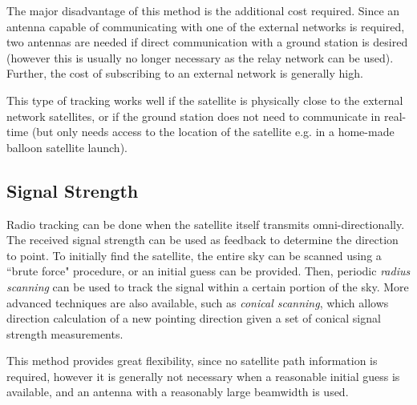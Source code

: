 The major disadvantage of this method is the additional cost required. Since an antenna capable of communicating with one of the external networks is required, two antennas are needed if direct communication with a ground station is desired (however this is usually no longer necessary as the relay network can be used). Further, the cost of subscribing to an external network is generally high.

This type of tracking works well if the satellite is physically close to the external network satellites, or if the ground station does not need to communicate in real-time (but only needs access to the location of the satellite e.g. in a home-made balloon satellite launch).

\subsection{Signal Strength}
Radio tracking can be done when the satellite itself transmits omni-directionally. The received signal strength can be used as feedback to determine the direction to point. To initially find the satellite, the entire sky can be scanned using a ``brute force" procedure, or an initial guess can be provided. Then, periodic \textit{radius scanning} can be used to track the signal within a certain portion of the sky. More advanced techniques are also available, such as \textit{conical scanning}, which allows direction calculation of a new pointing direction given a set of conical signal strength measurements.

This method provides great flexibility, since no satellite path information is required, however it is generally not necessary when a reasonable initial guess is available, and an antenna with a reasonably large beamwidth is used.